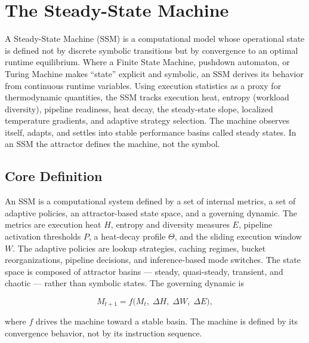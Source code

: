 
\section{The Steady-State Machine}

A Steady-State Machine (SSM) is a computational model whose operational state is
defined not by discrete symbolic transitions but by convergence to an optimal
runtime equilibrium. Where a Finite State Machine, pushdown automaton, or Turing
Machine makes ``state'' explicit and symbolic, an SSM derives its behavior from
continuous runtime variables. Using execution statistics as a proxy for
thermodynamic quantities, the SSM tracks execution heat, entropy (workload
diversity), pipeline readiness, heat decay, the steady-state slope, localized
temperature gradients, and adaptive strategy selection. The machine observes
itself, adapts, and settles into stable performance basins called steady states.
In an SSM the attractor defines the machine, not the symbol.

\subsection{Core Definition}

An SSM is a computational system defined by a set of internal metrics, a set of
adaptive policies, an attractor-based state space, and a governing dynamic. The
metrics are execution heat $H$, entropy and diversity measures $E$, pipeline
activation thresholds $P$, a heat-decay profile $\Theta$, and the sliding
execution window $W$. The adaptive policies are lookup strategies, caching
regimes, bucket reorganizations, pipeline decisions, and inference-based mode
switches. The state space is composed of attractor basins --- steady,
quasi-steady, transient, and chaotic --- rather than symbolic states. The
governing dynamic is

\begin{equation}
M_{t+1} = f\bigl(M_t,\; \Delta H,\; \Delta W,\; \Delta E\bigr),
\end{equation}

where $f$ drives the machine toward a stable basin. The machine is defined by its
convergence behavior, not by its instruction sequence.

